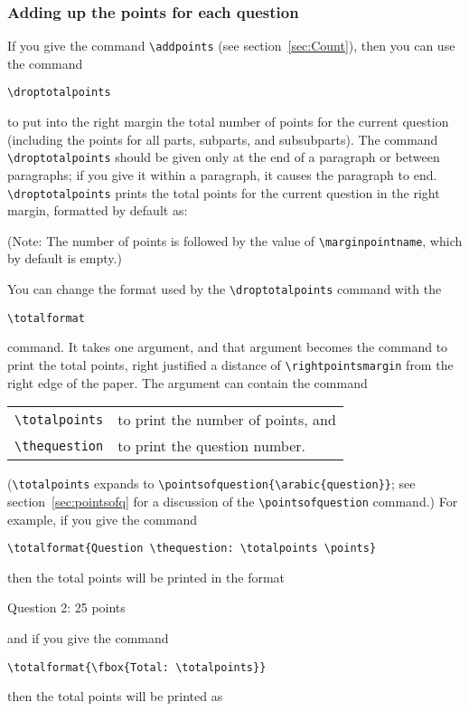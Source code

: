\documentclass[12pt]{exam}
\begin{document}
\subsubsection{Adding up the points for each question}


If you give the command \verb"\addpoints" (see
section~\ref{sec:Count}), then you can use the command
\begin{center}
  \verb"\droptotalpoints"
\end{center}
to put into the right margin the total number of points for the
current question (including the points for all parts, subparts, and
subsubparts).  The command \verb"\droptotalpoints" should be given
only at the end of a paragraph or between paragraphs; if you give it
within a paragraph, it causes the paragraph to end.
\verb"\droptotalpoints" prints the total points for the current
question in the right margin, formatted by default as:
\par\nobreak\medskip
\makeatletter
  \leavevmode\nobreak\hfill
\makeatother
  \par
\medskip
\noindent
(Note: The number of points is followed by the value of
\verb"\marginpointname", which by default is empty.)

You can change the format used by the \verb"\droptotalpoints" command
with the
\begin{center}
  \verb"\totalformat"
\end{center}
command.  It takes one argument, and that argument becomes the command
to print the total points, right justified a distance of
\verb"\rightpointsmargin" from the right edge of the paper.  The
argument can contain the command
\begin{center}
  \begin{tabular}{ll}
    \verb"\totalpoints"& to print the number of points, and\\
    \verb"\thequestion"& to print the question number.
  \end{tabular}
\end{center}
(\verb"\totalpoints" expands to
\verb"\pointsofquestion{\arabic{question}}"; see
section~\ref{sec:pointsofq} for a discussion of the
\verb"\pointsofquestion" command.)  For example, if you give the
command
\begin{center}
  \verb"\totalformat{Question \thequestion: \totalpoints \points}"
\end{center}
then the total points will be printed in the format
\begin{center}
  Question 2: 25 points
\end{center}
and if you give the command
\begin{center}
\verb"\totalformat{\fbox{Total: \totalpoints}}"
\end{center}
then the total points will be printed as
\begin{center}
\end{center}
\end{document}
